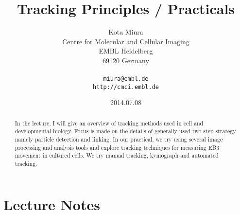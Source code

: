 \documentclass[11pnt]{article}
\begin{document}
\author{Kota Miura\\
  Centre for Molecular and Cellular Imaging\\
  EMBL Heidelberg\\
  69120  Germany\\
  \\
  \texttt{miura@embl.de}\\
  \texttt{http://cmci.embl.de}}
\date{2014.07.08}
\title{Tracking Principles / Practicals}
\maketitle

\begin{abstract}
In the lecture, I will give an overview of tracking methods used in cell and developmental biology. Focus is made on the details of generally used two-step strategy namely particle detection and linking. In our practical, we try using several image processing and analysis tools and explore tracking techniques for measuring EB3 movement in cultured cells. We try manual tracking, kymograph and automated tracking. 
\end{abstract}

\section{Lecture Notes}
\end{document}
